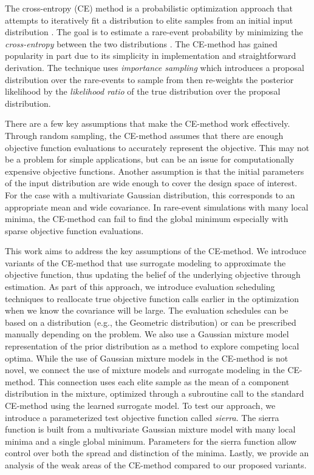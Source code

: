 The cross-entropy (CE) method is a probabilistic optimization approach that attempts to iteratively fit a distribution to elite samples from an initial input distribution \cite{rubinstein2004cross,rubinstein1999cross}.
The goal is to estimate a rare-event probability by minimizing the \textit{cross-entropy} between the two distributions \cite{de2005tutorial}.
The CE-method has gained popularity in part due to its simplicity in implementation and straightforward derivation.
The technique uses \textit{importance sampling} which introduces a proposal distribution over the rare-events to sample from then re-weights the posterior likelihood by the \textit{likelihood ratio} of the true distribution over the proposal distribution.

There are a few key assumptions that make the CE-method work effectively.
Through random sampling, the CE-method assumes that there are enough objective function evaluations to accurately represent the objective. 
This may not be a problem for simple applications, but can be an issue for computationally expensive objective functions. 
Another assumption is that the initial parameters of the input distribution are wide enough to cover the design space of interest. For the case with a multivariate Gaussian distribution, this corresponds to an appropriate mean and wide covariance.
In rare-event simulations with many local minima, the CE-method can fail to find the global minimum especially with sparse objective function evaluations.

This work aims to address the key assumptions of the CE-method.
We introduce variants of the CE-method that use surrogate modeling to approximate the objective function, thus updating the belief of the underlying objective through estimation.
As part of this approach, we introduce evaluation scheduling techniques to reallocate true objective function calls earlier in the optimization when we know the covariance will be large.
The evaluation schedules can be based on a distribution (e.g., the Geometric distribution) or can be prescribed manually depending on the problem.
We also use a Gaussian mixture model representation of the prior distribution as a method to explore competing local optima.
While the use of Gaussian mixture models in the CE-method is not novel, we connect the use of mixture models and surrogate modeling in the CE-method.
This connection uses each elite sample as the mean of a component distribution in the mixture, optimized through a subroutine call to the standard CE-method using the learned surrogate model.
To test our approach, we introduce a parameterized test objective function called \textit{sierra}.
The sierra function is built from a multivariate Gaussian mixture model with many local minima and a single global minimum.
Parameters for the sierra function allow control over both the spread and distinction of the minima.
Lastly, we provide an analysis of the weak areas of the CE-method compared to our proposed variants.


